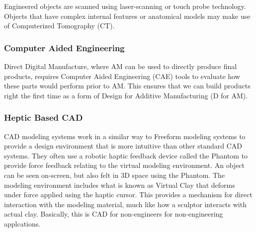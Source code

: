Engineered objects are scanned using laser-scanning or touch probe technology. Objects that have complex internal features or anatomical
models may make use of Computerized Tomography (CT).

\subsubsection{Computer Aided Engineering}
Direct Digital Manufacture, where AM can be used to directly produce
final products, requires Computer Aided Engineering (CAE) tools to evaluate how these parts
would perform prior to AM. This ensures that we can build products right the first time as a
form of Design for Additive Manufacturing (D for AM).

\subsubsection{Heptic Based CAD}
CAD modeling systems work
in a similar way to Freeform modeling systems to
provide a design environment that is more intuitive than other standard CAD
systems. They often use a robotic haptic feedback device called the Phantom to provide force feedback relating to the virtual modeling environment. An object can
be seen on-screen, but also felt in 3D space using the Phantom. The modeling
environment includes what is known as Virtual Clay that deforms under force
applied using the haptic cursor. This provides a mechanism for direct interaction
with the modeling material, much like how a sculptor interacts with actual clay. Basically, this is CAD for non-engineers for non-engineering applcations.

